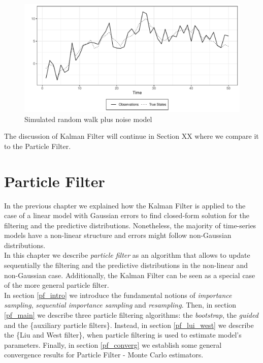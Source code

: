 \documentclass[
]{book}
\theoremstyle{break}
\theoremstyle{nonumberplain}
\begin{document}
\begin{figure}[H]

{\centering \includegraphics{final-draft_files/figure-latex/unnamed-chunk-8-1} 

}

\caption{Simulated random walk plus noise model}\label{fig:unnamed-chunk-8}
\end{figure}

The discussion of Kalman Filter will continue in Section XX where we
compare it to the Particle Filter.

\chapter{Particle Filter}

In the previous chapter we explained how the Kalman Filter is applied to
the case of a linear model with Gaussian errors to find closed-form
solution for the filtering and the predictive distributions.
Nonetheless, the majority of time-series models have a non-linear
structure and errors might follow non-Gaussian distributions.\\
In this chapter we describe \textit{particle filter} as an algorithm
that allows to update sequentially the filtering and the predictive
distributions in the non-linear and non-Gaussian case. Additionally, the
Kalman Filter can be seen as a special case of the more general particle
filter.\\
In section \ref{pf_intro} we introduce the fundamental notions of
\textit{importance sampling}, \textit{sequential importance sampling}
and \textit{resampling}. Then, in section \ref{pf_main} we describe
three particle filtering algorithms: the \textit{bootstrap}, the
\textit{guided} and the \{auxiliary particle filters\}. Instead, in
section \ref{pf_lui_west} we describe the \{Liu and West filter\}, when
particle filtering is used to estimate model's parameters. Finally, in
section \ref{pf_converg} we establish some general convergence results
for Particle Filter - Monte Carlo estimators.
\end{document}
